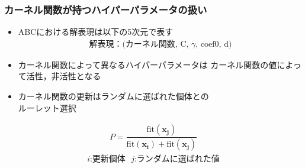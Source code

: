 \documentclass[11pt,dvipdfmx,cjk]{beamer}
\begin{document}
\begin{frame}
  \frametitle{カーネル関数が持つハイパーパラメータの扱い}
  \begin{itemize}
  \item ABCにおける解表現は以下の5次元で表す
  \begin{align*}
    \text{解表現：(カーネル関数, C, $\gamma$, coef0, d)}
  \end{align*}
  \item カーネル関数によって異なるハイパーパラメータは
       カーネル関数の値によって活性，非活性となる
  \item カーネル関数の更新はランダムに選ばれた個体との\\ルーレット選択 
  \end{itemize}
  \begin{align*}
    P = \dfrac{\mathrm{fit}(\boldsymbol{x_j})}
    {\mathrm{fit}(\boldsymbol{x_i})+\mathrm{fit}(\boldsymbol{x_j})} 
    \end{align*}
    \begin{align*}
    \text{$i$:更新個体~~$j$:ランダムに選ばれた値}
  \end{align*} 
\end{frame}
\end{document}
